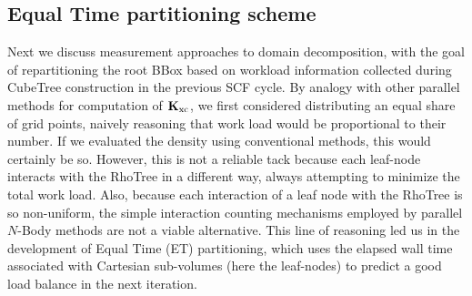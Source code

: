 \commentoutA{\documentclass[prl,aps,twocolumn,showpacs,twocolumngrid,superbib]{revtex4}}
\newcommand{\Kxc}{{\bf K}_{\mathrm{xc}}}
\begin{document}
\subsection{Equal Time partitioning scheme}
\label{subsec:Equal Time}

Next we discuss measurement approaches to domain decomposition, with
the goal of repartitioning the root BBox based on workload information
collected during CubeTree construction in the previous SCF cycle.  
By analogy with other parallel methods for computation of $\Kxc$,
we first considered distributing an equal share of grid points, naively 
reasoning that work load would be proportional to their number. 
If we evaluated the density using conventional methods, this would 
certainly be so.  However, this is not a reliable tack because 
each leaf-node interacts with the RhoTree in a different way, always attempting to 
minimize the total work load.  Also, because each interaction of a leaf 
node with the RhoTree is so non-uniform, the simple 
interaction counting mechanisms employed by parallel $N$-Body methods 
\cite{JPilkington96,warren:92_article,Grama94_article,Warren95b,Singh93,Singh_95v27,Grama_98v24}
are not a viable alternative.  This line of reasoning led us in the
development of Equal Time (ET) partitioning,  which uses the elapsed
wall time associated with Cartesian sub-volumes (here the leaf-nodes)
to predict a good load balance in the next iteration.
\end{document}
